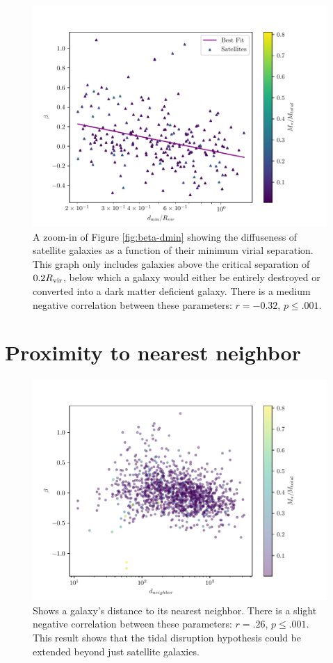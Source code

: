 \begin{figure}
    \centering
    \includegraphics*[width=\textwidth*2/3]{figs/me/beta-dmin-fit.pdf}
    \caption{A zoom-in of Figure \ref{fig:beta-dmin} showing the diffuseness of satellite galaxies as a function of their minimum virial separation. This graph only includes galaxies above the critical separation of $0.2 R_{\rm{vir}}$, below which a galaxy would either be entirely destroyed or converted into a dark matter deficient galaxy. There is a medium negative correlation between these parameters: $r=-0.32$, $p \leq .001$.}
    \label{fig:beta-dmin-fit}
\end{figure}


\section{Proximity to nearest neighbor}

\begin{figure}
    \centering
    \includegraphics*[width=\textwidth*2/3]{figs/me/beta-d_nearest.pdf}
    \caption{Shows a galaxy's distance to its nearest neighbor. There is a slight negative correlation between these parameters: $r = .26$, $p \leq .001$. This result shows that the tidal disruption hypothesis could be extended beyond just satellite galaxies.}

\end{figure}

